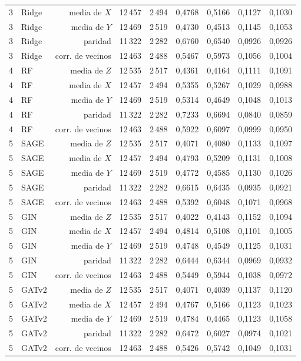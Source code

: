 \begin{table}[htbp]
{\begin{tabular}{@{}llrrrrrrr@{}}
        3 & Ridge & media de $X$ & 12\,457 & 2\,494 & 0,4768 & 0,5166 & 0,1127 & 0,1030 \\
        3 & Ridge & media de $Y$ & 12\,469 & 2\,519 & 0,4730 & 0,4513 & 0,1145 & 0,1053 \\
        3 & Ridge & paridad & 11\,322 & 2\,282 & 0,6760 & 0,6540 & 0,0926 & 0,0926 \\
        3 & Ridge & corr. de vecinos & 12\,463 & 2\,488 & 0,5467 & 0,5973 & 0,1056 & 0,1004 \\
        4 & RF & media de $Z$ & 12\,535 & 2\,517 & 0,4361 & 0,4164 & 0,1111 & 0,1091 \\
        4 & RF & media de $X$ & 12\,457 & 2\,494 & 0,5355 & 0,5267 & 0,1029 & 0,0988 \\
        4 & RF & media de $Y$ & 12\,469 & 2\,519 & 0,5314 & 0,4649 & 0,1048 & 0,1013 \\
        4 & RF & paridad & 11\,322 & 2\,282 & 0,7233 & 0,6694 & 0,0840 & 0,0859 \\
        4 & RF & corr. de vecinos & 12\,463 & 2\,488 & 0,5922 & 0,6097 & 0,0999 & 0,0950 \\
        5 & SAGE & media de $Z$ & 12\,535 & 2\,517 & 0,4071 & 0,4080 & 0,1133 & 0,1097 \\
        5 & SAGE & media de $X$ & 12\,457 & 2\,494 & 0,4793 & 0,5209 & 0,1131 & 0,1008 \\
        5 & SAGE & media de $Y$ & 12\,469 & 2\,519 & 0,4772 & 0,4585 & 0,1130 & 0,1026 \\
        5 & SAGE & paridad & 11\,322 & 2\,282 & 0,6615 & 0,6435 & 0,0935 & 0,0921 \\
        5 & SAGE & corr. de vecinos & 12\,463 & 2\,488 & 0,5392 & 0,6048 & 0,1071 & 0,0968 \\
        5 & GIN & media de $Z$ & 12\,535 & 2\,517 & 0,4022 & 0,4143 & 0,1152 & 0,1094 \\
        5 & GIN & media de $X$ & 12\,457 & 2\,494 & 0,4814 & 0,5108 & 0,1101 & 0,1005 \\
        5 & GIN & media de $Y$ & 12\,469 & 2\,519 & 0,4748 & 0,4549 & 0,1125 & 0,1031 \\
        5 & GIN & paridad & 11\,322 & 2\,282 & 0,6444 & 0,6344 & 0,0969 & 0,0932 \\
        5 & GIN & corr. de vecinos & 12\,463 & 2\,488 & 0,5449 & 0,5944 & 0,1038 & 0,0972 \\
        5 & GATv2 & media de $Z$ & 12\,535 & 2\,517 & 0,4071 & 0,4039 & 0,1137 & 0,1120 \\
        5 & GATv2 & media de $X$ & 12\,457 & 2\,494 & 0,4767 & 0,5166 & 0,1123 & 0,1023 \\
        5 & GATv2 & media de $Y$ & 12\,469 & 2\,519 & 0,4784 & 0,4465 & 0,1123 & 0,1058 \\
        5 & GATv2 & paridad & 11\,322 & 2\,282 & 0,6472 & 0,6027 & 0,0974 & 0,1021 \\
        5 & GATv2 & corr. de vecinos & 12\,463 & 2\,488 & 0,5426 & 0,5742 & 0,1049 & 0,1031 \\
        \bottomrule
    \end{tabular}}


\end{table}
